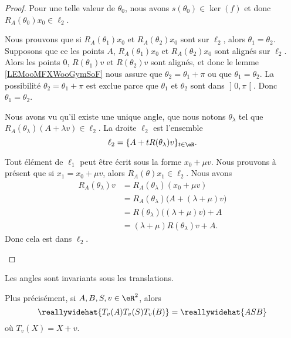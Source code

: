 \begin{proof}
	Pour une telle valeur de \( \theta_{0}\), nous avons \( s(\theta_{0})\in \ker(f)\) et donc \( R_A(\theta_{0})x_0\in \ell_2\).

	\begin{subproof}
		\spitem[Unicité]
		Nous prouvons que si \( R_A(\theta_1)x_0\) et \( R_A(\theta_2)x_0\) sont sur \( \ell_2\), alors \( \theta_1=\theta_2\). Supposons que ce les points \( A\), \( R_A(\theta_1)x_0\) et \( R_A(\theta_2)x_0\) sont alignés sur \( \ell_2\). Alors les points \( 0\), \( R(\theta_1)v\) et \( R(\theta_2)v\) sont alignés, et donc le lemme \ref{LEMooMFXWooGymSoF} nous assure que \( \theta_2=\theta_1+\pi\) ou que \( \theta_1=\theta_2\). La possibilité \( \theta_2=\theta_1+\pi\) est exclue parce que \( \theta_1\) et \( \theta_2\) sont dans \( \mathopen] 0 , \pi \mathclose[\). Donc \( \theta_1=\theta_2\).

		Nous avons vu qu'il existe une unique angle, que nous notons \( \theta_{\lambda} \) tel que \( R_A(\theta_{\lambda})(A+\lambda v)\in \ell_2\).
		La droite \( \ell_2\) est l'ensemble
		\begin{equation}
			\ell_2=\{ A+ t R(\theta_{\lambda})v \}_{t\in \eR}.
		\end{equation}

		Tout élément de \( \ell_1\) peut être écrit sous la forme \( x_0+\mu v\). Nous prouvons à présent que si \( x_1=x_0+ \mu v\), alors \( R_A(\theta)x_1\in\ell_2\). Nous avons
		\begin{subequations}
			\begin{align}
				R_A(\theta_{\lambda})v & =R_A(\theta_{\lambda})(x_0+\mu v)                  \\
				                       & =R_A(\theta_{\lambda})\big( A+(\lambda+\mu)v \big) \\
				                       & =R(\theta_{\lambda})\big( (\lambda+\mu)v \big)+A   \\
				                       & =(\lambda+\mu)R(\theta_{\lambda})v+A.
			\end{align}
		\end{subequations}
		Donc cela est dans \( \ell_2\).
	\end{subproof}
\end{proof}

\begin{proposition}      \label{PROPooKVSHooRODGWE}
	Les angles sont invariants sous les translations.

	Plus précisément, si \( A,B,S,v\in \eR^2\), alors
	\begin{equation}
		\reallywidehat{T_v(A)T_v(S)T_v(B)}=\reallywidehat{ASB}
	\end{equation}
	où \( T_v(X)=X+v\).
\end{proposition}

